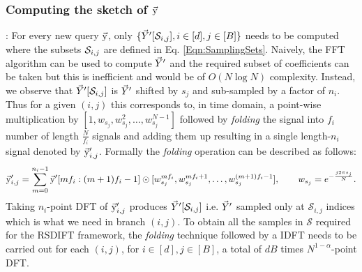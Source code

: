 \documentclass[journal,11pt,onecolumn]{IEEEtran}  %
\begin{document}
\subsubsection*{Computing the sketch of $\vec{\mathrm{y}}$}: For every new query $\vec{\mathrm{y}}$, only $\{\vec{Y}'[\mathcal{S}_{i,j}],i\in[d],j\in[B]\}$ needs to be computed where the subsets $\mathcal{S}_{i,j}$ are defined in Eq. \eqref{Eqn:SamplingSets}. Naively, the FFT algorithm can be used to compute $\vec{Y}'$ and the required subset of coefficients can be taken but this is inefficient and would be of $O(N \log N)$ complexity. Instead, we observe that $\vec{Y}'[\mathcal{S}_{i,j}]$ is $\vec{Y}'$ shifted by $s_j$ and sub-sampled by a factor of $n_i$. Thus for a given $(i,j)$ this corresponds to, in time domain, a point-wise multiplication by $[1,w_{s_j},w_{s_j}^2,\ldots,w_{s_j}^{N-1}]$ followed by \textit{folding} the signal into $f_i$ number of length $\frac{N}{f_i}$ signals and adding them up resulting in a single length-$n_i$ signal denoted by $\vec{\mathrm{y}}'_{i,j}$. Formally the \textit{folding} operation can be described as follows:
	  \begin{equation}
	  	\vec{\mathrm{y}}'_{i,j} = \sum \limits_{m = 0}^{n_i-1} \vec{\mathrm{y}}'[mf_i:(m+1)f_i-1] \odot [w_{s_j}^{mf_i},w_{s_j}^{mf_i+1},\ldots, w_{s_j}^{(m+1)f_i-1}],\qquad w_{s_j}=e^{-\frac{j2\pi s_j}{N}}.
	  \end{equation}
 Taking $n_i$-point DFT of $\vec{\mathrm{y}}'_{i,j}$ produces $\vec{Y}'[\mathcal{S}_{i,j}]$ i.e. $\vec{Y}'$ sampled only at $\mathcal{S}_{i,j}$ indices which is what we need in branch $(i,j)$. To obtain all the samples in $\mathcal{S}$ required for the RSDIFT framework, the \textit{folding} technique followed by a IDFT needs to be carried out for each $(i,j)$, for $i\in[d],j\in[B]$, a total of $dB$ times $N^{1-\alpha}$-point DFT.





\end{document}
